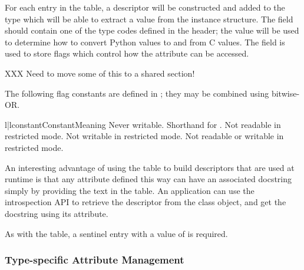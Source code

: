 For each entry in the table, a descriptor will be constructed and
added to the type which will be able to extract a value from the
instance structure.  The  field should contain one of the
type codes defined in the  header; the value will
be used to determine how to convert Python values to and from C
values.  The  field is used to store flags which control
how the attribute can be accessed.

XXX Need to move some of this to a shared section!

The following flag constants are defined in ;
they may be combined using bitwise-OR.

\begin{tableii}{l|l}{constant}{Constant}{Meaning}
         {Never writable.}
         {Shorthand for .}
         {Not readable in restricted mode.}
         {Not writable in restricted mode.}
         {Not readable or writable in restricted mode.}
\end{tableii}

An interesting advantage of using the  table to
build descriptors that are used at runtime is that any attribute
defined this way can have an associated docstring simply by providing
the text in the table.  An application can use the introspection API
to retrieve the descriptor from the class object, and get the
docstring using its  attribute.

As with the  table, a sentinel entry with a
 value of \NULL{} is required.  


%


\subsubsection{Type-specific Attribute Management}

